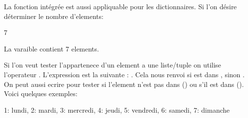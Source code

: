 \documentclass[letterpaper,10pt,french]{sphinxmanual}
\begin{document}
\begin{sphinxVerbatim}[commandchars=\\\{\}]
\end{sphinxVerbatim}

\sphinxAtStartPar
La fonction intégrée  est aussi appliquable pour les dictionnaires. Si l’on désire déterminer le nombre d’elements:

\begin{sphinxVerbatim}[commandchars=\\\{\}]
\end{sphinxVerbatim}

\begin{sphinxVerbatim}[commandchars=\\\{\}]
7
\end{sphinxVerbatim}

\sphinxAtStartPar
La varaible  contient 7 elements.

\sphinxAtStartPar
Si l’on veut tester l’appartenece d’un element a une liste/tuple on utilise l’operateur . L’expression est la suivante : . Cela nous renvoi  si est dans , sinon . On peut aussi ecrire  pour tester si l’element n’est pas dans  () ou s’il est dans  (). Voici quelques exemples:

\begin{sphinxVerbatim}[commandchars=\\\{\}]
\end{sphinxVerbatim}

\begin{sphinxVerbatim}[commandchars=\\\{\}]
\PYGZob{}1: \PYGZsq{}lundi\PYGZsq{},
 2: \PYGZsq{}mardi\PYGZsq{},
 3: \PYGZsq{}mercredi\PYGZsq{},
 4: \PYGZsq{}jeudi\PYGZsq{},
 5: \PYGZsq{}vendredi\PYGZsq{},
 6: \PYGZsq{}samedi\PYGZsq{},
 7: \PYGZsq{}dimanche\PYGZsq{}\PYGZcb{}
\end{sphinxVerbatim}

\begin{sphinxVerbatim}[commandchars=\\\{\}]
\end{sphinxVerbatim}
\end{document}
